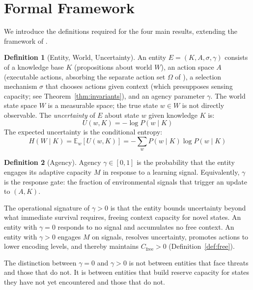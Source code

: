 \documentclass[11pt]{article}
\theoremstyle{definition}
\newtheorem{definition}{Definition}
\theoremstyle{remark}
\begin{document}
\section{Formal Framework}
\label{sec:framework}

We introduce the definitions required for the four main results,
extending the framework of \cite{McCarthy2026a}.

\begin{definition}[Entity, World, Uncertainty]
\label{def:entity}
An entity $E = (K, A, \sigma, \gamma)$ consists of a knowledge base $K$
(propositions about world $W$), an action space $A$ (executable
actions, absorbing the separate action set $\Omega$ of
\cite{McCarthy2026b}), a selection mechanism $\sigma$ that chooses
actions given context (which presupposes sensing capacity; see
Theorem~\ref{thm:invariants}), and an agency parameter $\gamma$. The world state space $W$ is a
measurable space; the true state $w \in W$ is not directly observable.
The \emph{uncertainty} of $E$ about state $w$ given knowledge $K$ is:
\[
U(w, K) = -\log P(w \mid K)
\]
The expected uncertainty is the conditional entropy:
\[
H(W \mid K) = \mathbb{E}_w[U(w, K)] = -\sum_w P(w \mid K) \log P(w \mid K)
\]
\end{definition}

\begin{definition}[Agency]
\label{def:agency}
Agency $\gamma \in [0, 1]$ is the probability that the entity engages its
adaptive capacity $M$ in response to a learning signal. Equivalently,
$\gamma$ is the response gate: the fraction of environmental signals that
trigger an update to $(A, K)$.

The operational signature of $\gamma > 0$ is that the entity bounds
uncertainty beyond what immediate survival requires, freeing context
capacity for novel states. An entity with $\gamma = 0$ responds to no
signal and accumulates no free context. An entity with $\gamma > 0$
engages $M$ on signals, resolves uncertainty, promotes actions to lower
encoding levels, and thereby maintains $C_{\mathrm{free}} > 0$
(Definition~\ref{def:free}).

The distinction between $\gamma = 0$ and $\gamma > 0$ is not between
entities that face threats and those that do not. It is between entities
that build reserve capacity for states they have not yet encountered and
those that do not.
\end{definition}
\end{document}
